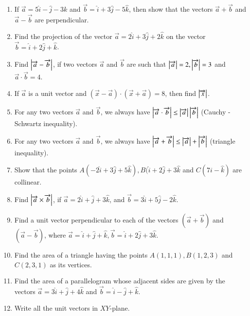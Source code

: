 \documentclass{article}
\theoremstyle{remark}
\begin{document}
\begin{enumerate}
\item If $\overrightarrow{a} = 5\hat{i} -\hat{j} -3{k}$ and $\overrightarrow{b} = \hat{i} +3\hat{j} -5\hat{k}$, then show that the vectors $\overrightarrow{a}+\overrightarrow{b}$ and $\overrightarrow{a}-\overrightarrow{b}$ are perpendicular.
\item Find the projection of the vector $\overrightarrow{a} = 2\hat{i} +3\hat{j} +2\hat{k}$ on the vector $\overrightarrow{b} = \hat{i} +2\hat{j} +\hat{k}$.
\item Find $\left\vert\overrightarrow{a}-\overrightarrow{b}\right\vert$, if two vectors $\overrightarrow{a}$ and $\overrightarrow{b}$ are such that $\left\vert\overrightarrow{a}\right\vert=2, \left\vert\overrightarrow{b}\right\vert=3$ and $\overrightarrow{a} \cdot \overrightarrow{b}=4$.
\item If $\overrightarrow{a}$ is a unit vector and $(\overrightarrow{x}-\overrightarrow{a}) \cdot (\overrightarrow{x}+\overrightarrow{a})=8$, then find $\left\vert\overrightarrow{x}\right\vert$.
\item For any two vectors $\overrightarrow{a}$ and $\overrightarrow{b}$, we always have $\left\vert\overrightarrow{a} \cdot \overrightarrow{b}\right\vert \leq  \left\vert\overrightarrow{a}\right\vert \left\vert\overrightarrow{b}\right\vert$ (Cauchy - Schwartz inequality).
\item For any two vectors $\overrightarrow{a}$ and $\overrightarrow{b}$, we always have $\left\vert\overrightarrow{a}+\overrightarrow{b}\right\vert \leq \left\vert\overrightarrow{a}\right\vert +\left\vert\overrightarrow{b}\right\vert$ (triangle inequality).
\item Show that the points $A(-2\hat{i} +3\hat{j} +5\hat{k}), B(\hat{i}+2\hat{j} +3\hat{k}$ and $C(7{i} -\hat{k})$ are collinear.
\item Find $\left\vert\overrightarrow{a} \times \overrightarrow{b}\right\vert$, if $\overrightarrow{a} = 2\hat{i} +\hat{j} +3\hat{k}$, and $\overrightarrow{b} = 3\hat{i} +5\hat{j} -2\hat{k}$.
\item Find a unit vector perpendicular to each of the vectors $(\overrightarrow{a} +\overrightarrow{b})$ and $(\overrightarrow{a} -\overrightarrow{b})$, where $\overrightarrow{a}=\hat{i} +\hat{j} +\hat{k}, \overrightarrow{b} = \hat{i} +2\hat{j} +3\hat{k}$.
\item Find the area of a triangle having the points $A(1,1,1), B(1,2,3)$ and $C(2,3,1)$ as its vertices.
\item Find the area of a parallelogram whose adjacent sides are given by the vectors $\overrightarrow{a}=3\hat{i} +\hat{j} +4\hat{k}$ and $\overrightarrow{b}=\hat{i} -\hat{j} +\hat{k}$.
\item Write all the unit vectors in $XY$-plane.

\end{enumerate}
\end{document}
